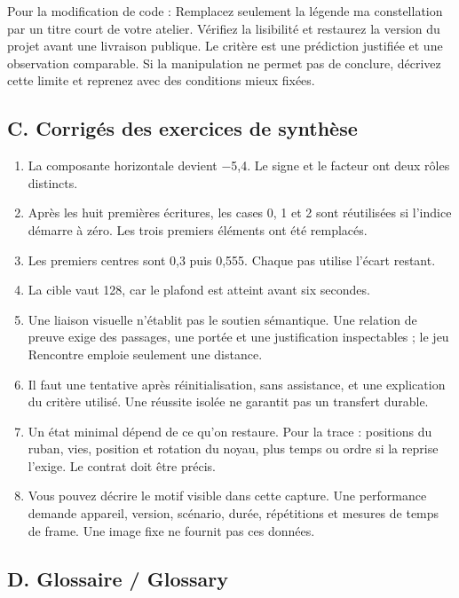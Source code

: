 \documentclass[
  canadien,
  11pt,
  letterpaper,
]{article}
\providecommand{\tightlist}{%
  \setlength{\itemsep}{0pt}\setlength{\parskip}{0pt}}
\begin{document}
Pour la modification de code : Remplacez seulement la légende ma
constellation par un titre court de votre atelier. Vérifiez la
lisibilité et restaurez la version du projet avant une livraison
publique. Le critère est une prédiction justifiée et une observation
comparable. Si la manipulation ne permet pas de conclure, décrivez cette
limite et reprenez avec des conditions mieux fixées.

\subsection{C. Corrigés des exercices de
synthèse}\label{c.-corriguxe9s-des-exercices-de-synthuxe8se}

\begin{enumerate}
\def\labelenumi{\arabic{enumi}.}
\tightlist
\item
  La composante horizontale devient −5,4. Le signe et le facteur ont
  deux rôles distincts.
\item
  Après les huit premières écritures, les cases 0, 1 et 2 sont
  réutilisées si l'indice démarre à zéro. Les trois premiers éléments
  ont été remplacés.
\item
  Les premiers centres sont 0,3 puis 0,555. Chaque pas utilise l'écart
  restant.
\item
  La cible vaut 128, car le plafond est atteint avant six secondes.
\item
  Une liaison visuelle n'établit pas le soutien sémantique. Une relation
  de preuve exige des passages, une portée et une justification
  inspectables ; le jeu Rencontre emploie seulement une distance.
\item
  Il faut une tentative après réinitialisation, sans assistance, et une
  explication du critère utilisé. Une réussite isolée ne garantit pas un
  transfert durable.
\item
  Un état minimal dépend de ce qu'on restaure. Pour la trace : positions
  du ruban, vies, position et rotation du noyau, plus temps ou ordre si
  la reprise l'exige. Le contrat doit être précis.
\item
  Vous pouvez décrire le motif visible dans cette capture. Une
  performance demande appareil, version, scénario, durée, répétitions et
  mesures de temps de frame. Une image fixe ne fournit pas ces données.
\end{enumerate}

\subsection{D. Glossaire / Glossary}\label{d.-glossaire-glossary}
\end{document}
